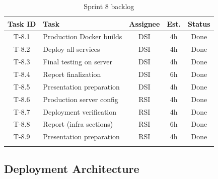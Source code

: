 \begin{longtable}{|c|p{5cm}|c|c|c|}
\hline
\rowcolor{blue!15}
\textbf{Task ID} & \textbf{Task} & \textbf{Assignee} & \textbf{Est.} & \textbf{Status} \\
\hline
\endhead
T-8.1 & Production Docker builds & DSI & 4h & Done \\
\hline
T-8.2 & Deploy all services & DSI & 4h & Done \\
\hline
T-8.3 & Final testing on server & DSI & 4h & Done \\
\hline
T-8.4 & Report finalization & DSI & 6h & Done \\
\hline
T-8.5 & Presentation preparation & DSI & 4h & Done \\
\hline
T-8.6 & Production server config & RSI & 4h & Done \\
\hline
T-8.7 & Deployment verification & RSI & 4h & Done \\
\hline
T-8.8 & Report (infra sections) & RSI & 6h & Done \\
\hline
T-8.9 & Presentation preparation & RSI & 4h & Done \\
\hline
\caption{Sprint 8 backlog}
\label{tab:sprint8-backlog}
\end{longtable}

\subsection{Deployment Architecture}

